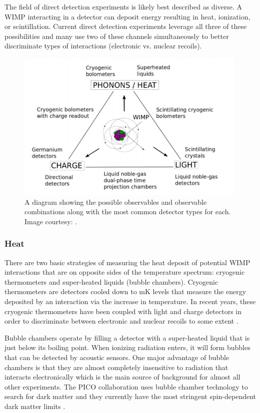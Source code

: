 The field of direct detection experiments is likely best described as diverse.  A WIMP interacting in a detector can deposit energy resulting in heat, ionization, or scintillation.  Current direct detection experiments leverage all three of these possibilities and many use two of these channels simultaneously to better discriminate types of interactions (electronic vs. nuclear recoils).  

\begin{figure}[t]
	\centering
	\includegraphics[width=0.99\textwidth]{dm_expts_2}
	\caption{A diagram showing the possible observables and observable combinations along with the most common detector types for each.  Image courtesy: \cite{undagoitia2015dark}.}
	\label{fig:dm_expts}
\end{figure}

\subsubsection{Heat}

There are two basic strategies of measuring the heat deposit of potential WIMP interactions that are on opposite sides of the temperature spectrum: cryogenic thermometers and super-heated liquids (bubble chambers).  Cryogenic thermometers are detectors cooled down to mK levels that measure the energy deposited by an interaction via the increase in temperature.  In recent years, these cryogenic thermometers have been coupled with light and charge detectors in order to discriminate between electronic and nuclear recoils to some extent \cite{strauss2016exploring}.  

Bubble chambers operate by filling a detector with a super-heated liquid that is just below its boiling point.  When ionizing radiation enters, it will form bubbles that can be detected by acoustic sensors.  One major advantage of bubble chambers is that they are almost completely insensitive to radiation that interacts electronically which is the main source of background for almost all other experiments.  The PICO collaboration uses bubble chamber technology to search for dark matter and they currently have the most stringent spin-dependent dark matter limits \cite{amole2017dark}.  

